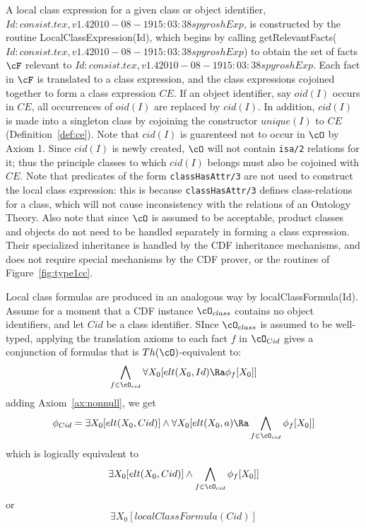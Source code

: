 A local class expression for a given class or object identifier, $Id: consist.tex,v 1.4 2010-08-19 15:03:38 spyrosh Exp $,
is constructed by the routine {\sf LocalClassExpression(Id)}, which
begins by calling {\sf getRelevantFacts($Id: consist.tex,v 1.4 2010-08-19 15:03:38 spyrosh Exp $)} to obtain the set of
facts $\cF$ relevant to $Id: consist.tex,v 1.4 2010-08-19 15:03:38 spyrosh Exp $.  Each fact in $\cF$ is translated to a
class expression, and the class expressions cojoined together to form
a class expression $CE$.  If an object identifier, say $oid(I)$ occurs
in $CE$, all occurrences of $oid(I)$ are replaced by $cid(I)$.  In
addition, $cid(I)$ is made into a singleton class by cojoining the
constructor $unique(I)$ to $CE$ (Definition~\ref{def:ce}).  Note that
$cid(I)$ is guarenteed not to occur in $\cO$ by Axiom 1.  Since
$cid(I)$ is newly created, $\cO$ will not contain {\tt isa/2}
relations for it; thus the principle classes to which $cid(I)$ belongs
must also be cojoined with $CE$.  Note that predicates of the form
{\tt classHasAttr/3} are not used to construct the local class
expression: this is because {\tt classHasAttr/3} defines
class-relations for a class, which will not cause inconsistency with
the relations of an Ontology Theory.  Also note that since $\cO$ is
assumed to be acceptable, product classes and objects do not need to
be handled separately in forming a class expression.  Their
specialized inheritance is handled by the CDF inheritance mechanisms,
and does not require special mechanisms by the CDF prover, or the
routines of Figure~\ref{fig:type1cc}.


Local class formulas are produced in an analogous way by {\sf
localClassFormula(Id)}.  Assume for a moment that a CDF instance
$\cO_{class}$ contains no object identifiers, and let $Cid$ be a class
identifier.  SInce $\cO_{class}$ is assumed to be well-typed, applying
the translation axioms to each fact $f$ in $\cO_{Cid}$ gives a
conjunction of formulas that is $Th(\cO)$-equivalent to:
\[ 
\bigwedge_{f \in \cO_{cid}} \forall X_0 [elt(X_0,Id) \Ra \phi_f[X_0]]
\]
adding Axiom~\ref{ax:nonnull}, we get 
\[ 
\phi_{Cid} = \exists X_0 [elt(X_0,Cid)] \wedge \forall X_0 [elt(X_0,a) \Ra
				\bigwedge_{f \in \cO_{cid}} \phi_f[X_0]] 
\]
which is logically equivalent to 
\[ 
\exists X_0 [elt(X_0,Cid)] \wedge \bigwedge_{f \in \cO_{cid}} \phi_f[X_0]] 
\]
or 
\[ 
\exists X_0 [localClassFormula(Cid)] 
\]

